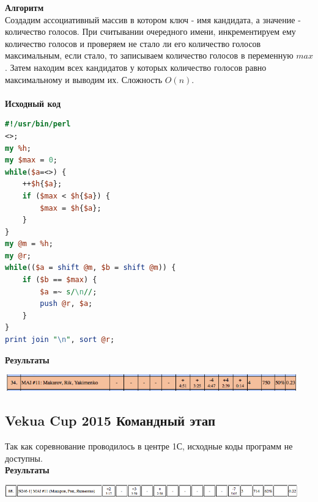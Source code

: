 \documentclass[a4paper,12pt]{article}
\begin{document}
\newpage

\textbf{{\large Алгоритм}} \\
Создадим ассоциативный массив в котором ключ - имя кандидата, а значение - количество голосов. При считывании очередного имени, инкрементируем ему количество голосов и проверяем не стало ли его количество голосов максимальным, если стало, то записываем количество голосов в переменную $max$. Затем находим всех кандидатов у которых количество голосов равно максимальному и выводим их. Сложность $O(n)$.\\ 
\\
\textbf{{\large Исходный код}}
\begin{lstlisting}[language=Perl]
#!/usr/bin/perl
<>;
my %h;
my $max = 0;
while($a=<>) {
	++$h{$a};
	if ($max < $h{$a}) {
		$max = $h{$a};
	}
}
my @m = %h;
my @r;
while(($a = shift @m, $b = shift @m)) {
	if ($b == $max) {
		$a =~ s/\n//;
		push @r, $a;
	}
}
print join "\n", sort @r;
\end{lstlisting}


\textbf{{\large Результаты}} \\
\begin{center}
\includegraphics[width=0.95\textwidth]{OC_America/OC_America_result.png}\\ [1cm]
\end{center}



%
%
\newpage
\subsection{Vekua Cup 2015 Командный этап}

Так как соревнование проводилось в центре 1С, исходные коды программ не доступны. \\

\textbf{{\large Результаты}} \\
\begin{center}
\includegraphics[width=0.95\textwidth]{Vekua_team/Vekua_team_result.png}\\ [1cm]
\end{center}
\end{document}
